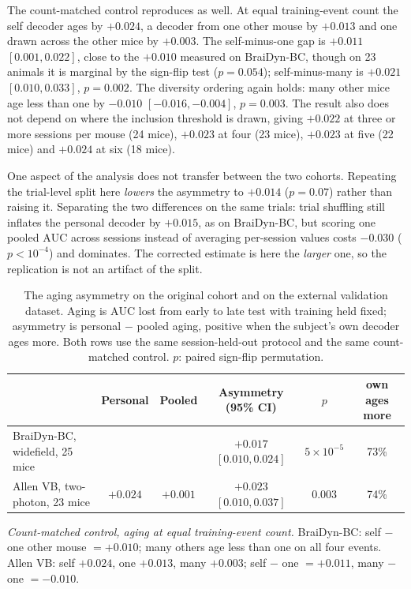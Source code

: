 \documentclass[mlmain,onecolumn]{jmlr}
\newcommand{\auc}{\mathrm{AUC}}
\begin{document}
The count-matched control reproduces as well. At equal training-event count the self decoder ages
by $+0.024$, a decoder from one other mouse by $+0.013$ and one drawn across the other mice by
$+0.003$. The self-minus-one gap is $+0.011$ $[0.001, 0.022]$, close to the $+0.010$ measured on
BraiDyn-BC, though on 23 animals it is marginal by the sign-flip test ($p = 0.054$); self-minus-many
is $+0.021$ $[0.010, 0.033]$, $p = 0.002$. The diversity ordering again holds: many other mice age
less than one by $-0.010$ $[-0.016, -0.004]$, $p = 0.003$.
The result also does not depend on where the inclusion threshold is drawn, giving $+0.022$ at three
or more sessions per mouse (24 mice), $+0.023$ at four (23 mice), $+0.023$ at five (22 mice) and
$+0.024$ at six (18 mice).

One aspect of the analysis does not transfer between the two cohorts. Repeating the trial-level
split here \emph{lowers} the asymmetry to
$+0.014$ ($p = 0.07$) rather than raising it. Separating the two differences on the same trials:
trial shuffling still inflates the personal decoder by $+0.015$, as on BraiDyn-BC, but scoring one
pooled $\auc$ across sessions instead of averaging per-session values costs $-0.030$
($p < 10^{-4}$) and dominates. The corrected estimate is here the \emph{larger} one, so the
replication is not an artifact of the split.

\begin{table}[t]\centering
\caption{The aging asymmetry on the original cohort and on the external validation dataset. Aging
is $\auc$ lost from early to late test with training held fixed; asymmetry is personal $-$ pooled
aging, positive when the subject's own decoder ages more. Both rows use the same session-held-out
protocol and the same count-matched control. $p$: paired sign-flip permutation.}
\label{tab:allen}
\setlength{\tabcolsep}{3pt}
{\small
\begin{tabular}{lccccc}
\toprule
& Personal & Pooled & Asymmetry (95\% CI) & $p$ & own ages more \\
\midrule
BraiDyn-BC, widefield, 25 mice & & & $+0.017$ $[0.010, 0.024]$ & $5\times10^{-5}$ & 73\% \\
Allen VB, two-photon, 23 mice & $+0.024$ & $+0.001$ & $+0.023$ $[0.010, 0.037]$ & 0.003 & 74\% \\
\bottomrule
\end{tabular}}

\vspace{3pt}
\begin{minipage}{0.95\linewidth}\small\raggedright
\emph{Count-matched control, aging at equal training-event count.} BraiDyn-BC: self $-$ one other
mouse $= +0.010$; many others age less than one on all four events. Allen VB: self $+0.024$, one
$+0.013$, many $+0.003$; self $-$ one $= +0.011$, many $-$ one $= -0.010$.
\end{minipage}
\end{table}
\end{document}
